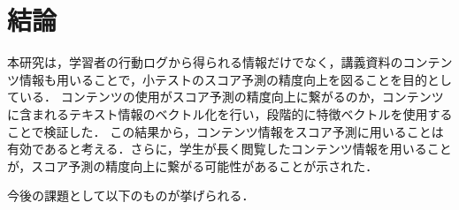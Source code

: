 \documentclass[a4paper,12pt]{ltjsreport}
\begin{document}
\chapter{結論}

本研究は，学習者の行動ログから得られる情報だけでなく，講義資料のコンテンツ情報も用いることで，小テストのスコア予測の精度向上を図ることを目的としている．
コンテンツの使用がスコア予測の精度向上に繋がるのか，コンテンツに含まれるテキスト情報のベクトル化を行い，段階的に特徴ベクトルを使用することで検証した．
この結果から，コンテンツ情報をスコア予測に用いることは有効であると考える．さらに，学生が長く閲覧したコンテンツ情報を用いることが，スコア予測の精度向上に繋がる可能性があることが示された．

今後の課題として以下のものが挙げられる．
\end{document}

